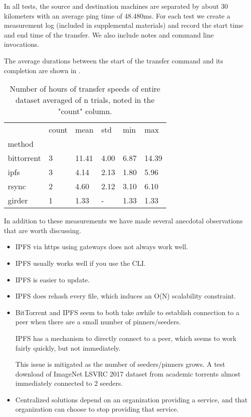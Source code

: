 \documentclass[10pt,twocolumn,letterpaper]{article}
\begin{document}
In all tests, the source and destination machines are separated by about 30
kilometers with an average ping time of 48.480ms. For each test we create a
measurement log (included in supplemental materials) and record the start
time and end time of the transfer. We also include notes and command line
invocations.

The average durations between the start of the transfer command and its
completion are shown in \cite{tab:transfertime}.

\begin{table}[t]
\begin{tabular}{llllll}
\toprule
{} & count &   mean &    std &   min &    max \\
method        &       &        &        &       &        \\
\midrule
bittorrent & 3 & 11.41 & 4.00 & 6.87 & 14.39 \\
ipfs & 3 & 4.14 & 2.13 & 1.80 & 5.96 \\
rsync & 2 & 4.60 & 2.12 & 3.10 & 6.10 \\
girder & 1 & 1.33 & - & 1.33 & 1.33 \\
\bottomrule
\end{tabular}
\label{tab:transfertime}
\caption[]{
    Number of hours of transfer speeds of entire dataset averaged of n trials,
    noted in the "count" column. 
}
\end{table}


In addition to these measurements we have made several anecdotal observations
that are worth discussing.

\begin{itemize}
    \item IPFS via https using gateways does not always work well.
    \item IPFS usually works well if you use the CLI.
    \item IPFS is easier to update.
    \item IPFS does rehash every file, which induces an O(N) scalability constraint.

    \item BitTorrent and IPFS seem to both take awhile to establish connection
          to a peer when there are a small number of pinners/seeders.

          IPFS has a mechanism to directly connect to a peer, which seems to
          work fairly quickly, but not immediately.

          This issue is mitigated as the number of seeders/pinners grows.
          A test download of ImageNet LSVRC 2017 dataset from academic torrents
          almost immediately connected to 2 seeders.

    \item Centralized solutions depend on an organization providing a service,
          and that organization can choose to stop providing that service.
\end{itemize}
\end{document}
